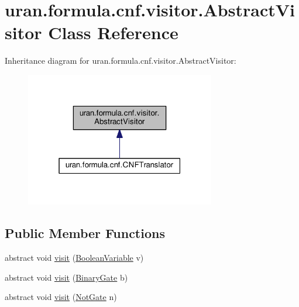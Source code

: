 \hypertarget{classuran_1_1formula_1_1cnf_1_1visitor_1_1_abstract_visitor}{}\section{uran.\+formula.\+cnf.\+visitor.\+Abstract\+Visitor Class Reference}
\label{classuran_1_1formula_1_1cnf_1_1visitor_1_1_abstract_visitor}


Inheritance diagram for uran.\+formula.\+cnf.\+visitor.\+Abstract\+Visitor\+:
\nopagebreak
\begin{figure}[H]
\begin{center}
\leavevmode
\includegraphics[width=235pt]{classuran_1_1formula_1_1cnf_1_1visitor_1_1_abstract_visitor__inherit__graph}
\end{center}
\end{figure}
\subsection*{Public Member Functions}
\begin{DoxyCompactItemize}
\item 
abstract void \hyperlink{classuran_1_1formula_1_1cnf_1_1visitor_1_1_abstract_visitor_a551b6f0af75ef93cd5b04a5488109fae}{visit} (\hyperlink{classuran_1_1formula_1_1cnf_1_1_boolean_variable}{Boolean\+Variable} v)
\item 
abstract void \hyperlink{classuran_1_1formula_1_1cnf_1_1visitor_1_1_abstract_visitor_ab7c9d906d3da6675a91bad079e193c78}{visit} (\hyperlink{classuran_1_1formula_1_1cnf_1_1_binary_gate}{Binary\+Gate} b)
\item 
abstract void \hyperlink{classuran_1_1formula_1_1cnf_1_1visitor_1_1_abstract_visitor_a1ff0fc0dfb5ea14efa693009f3954ce4}{visit} (\hyperlink{classuran_1_1formula_1_1cnf_1_1_not_gate}{Not\+Gate} n)
\end{DoxyCompactItemize}


